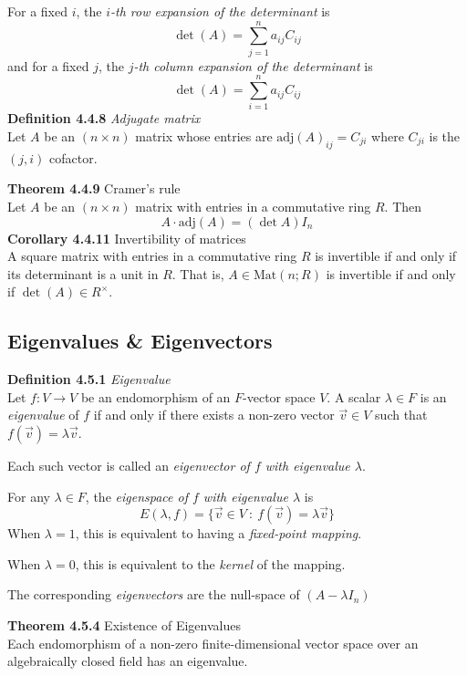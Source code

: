 \documentclass[8pt,landscape]{article}
\begin{document}
\begin{multicols}{3}
    For a fixed $i$, the \emph{$i$-th row expansion of the determinant} is
    \[
        \det(A) = \sum_{j=1}^n a_{ij} C_{ij}
    \]
    and for a fixed $j$, the \emph{$j$-th column expansion of the determinant} is
    \[
        \det(A) = \sum_{i=1}^n a_{ij} C_{ij}
    \]
    \textbf{Definition 4.4.8} \emph{Adjugate matrix} \\
    Let $A$ be an $(n \times n)$ matrix whose entries are
    $\mathrm{adj}{
    (A)}_{ij} = C_{ji}$ where $C_{ji}$ is the $(j, i)$ cofactor.

    \textbf{Theorem 4.4.9} Cramer's rule \\
    Let $A$ be an $(n \times n)$ matrix with entries in a commutative ring $R$.
    Then
    \[
        A \cdot \mathrm{adj}(A) = (\det A)I_n
    \]
    \textbf{Corollary 4.4.11} Invertibility of matrices \\
    A square matrix with entries in a commutative ring $R$ is invertible if and only if its
    determinant is a unit in $R$.
    That is, $A \in \mathrm{Mat}(n; R)$ is invertible if and only if
    $\det(A) \in R^\times$.

    \subsection{Eigenvalues \& Eigenvectors}

    \textbf{Definition 4.5.1} \emph{Eigenvalue} \\
    Let $f : V \to V$ be an endomorphism of an $F$-vector space $V$.
    A scalar $\lambda \in F$ is an \emph{eigenvalue} of $f$ if and only if there exists
    a non-zero vector $\vec{v} \in V$ such that $f(\vec{v}) = \lambda \vec{v}$.

    Each such vector is called an \emph{eigenvector of $f$ with eigenvalue $\lambda$}.

    For any $\lambda \in F$, the \emph{eigenspace of $f$ with eigenvalue $\lambda$} is
    \[
        E(\lambda, f) = \{ \vec{v} \in V \ : \ f(\vec{v}) = \lambda \vec{v} \}
    \]
    When $\lambda = 1$, this is equivalent to having a \emph{fixed-point mapping}.

    When $\lambda = 0$, this is equivalent to the \emph{kernel} of the mapping.

    The corresponding \emph{eigenvectors} are the null-space of $(A - \lambda I_n)$

    \textbf{Theorem 4.5.4} Existence of Eigenvalues \\
    Each endomorphism of a non-zero finite-dimensional vector space over an algebraically
    closed field has an eigenvalue.


\end{multicols}
\end{document}
